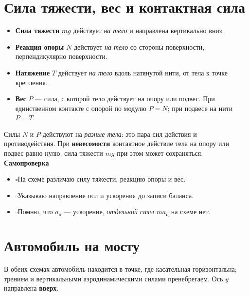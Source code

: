 \documentclass[a4paper,11pt]{article}
\newcommand{\checkitem}{\ensuremath{\square}\hspace{0.35em}}
\newcommand{\acent}{a_{\text{ц}}}
\newcommand{\mysection}[1]{\section{#1}\vspace{-0.2em}}
\begin{document}
\mysection{Сила тяжести, вес и контактная сила}
\begin{itemize}
\item \textbf{Сила тяжести} $mg$ действует \textit{на тело} и направлена вертикально вниз.
\item \textbf{Реакция опоры} $N$ действует \textit{на тело} со стороны поверхности, перпендикулярно поверхности.
\item \textbf{Натяжение} $T$ действует \textit{на тело} вдоль натянутой нити, от тела к точке крепления.
\item \textbf{Вес} $P$ --- сила, с которой тело действует на опору или подвес. При единственном контакте с опорой по модулю $P=N$; при подвесе на нити $P=T$.
\end{itemize}
Силы $N$ и $P$ действуют на \textit{разные тела}: это пара сил действия и противодействия. При \textbf{невесомости} контактное действие тела на опору или подвес равно нулю; сила тяжести $mg$ при этом может сохраняться.
\textcolor{darkaccent}{\textbf{Самопроверка}}
\begin{itemize}[label={},leftmargin=0pt]
\item \checkitem На схеме различаю силу тяжести, реакцию опоры и вес.
\item \checkitem Указываю направление оси и ускорения до записи баланса.
\item \checkitem Помню, что $\acent$ --- ускорение, \textit{отдельной силы} $m\acent$ на схеме нет.
\end{itemize}
\clearpage
\mysection{Автомобиль на мосту}
В обеих схемах автомобиль находится в точке, где касательная горизонтальна; трением и вертикальными аэродинамическими силами пренебрегаем. Ось $y$ направлена \textbf{вверх}.
\end{document}
